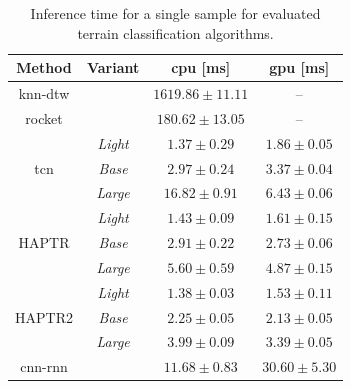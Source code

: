 \documentclass[a4paper, 10pt, twoside]{report}
\begin{document}
\begin{table}[ht]
\centering

\caption{ Inference time for a single sample for evaluated terrain classification algorithms.}

\begin{tabular}{cccc}
\hline
Method                 & Variant &  \acrshort{cpu} [ms] &  \acrshort{gpu} [ms] \\ 
 \hline
\acrshort{knn}-\acrshort{dtw}              &            & $1619.86 \pm 11.11 $               & -- \\ 
\acrshort{rocket}              &            &  $180.62 \pm 13.05 $                   &  -- \\\hline 
            

\multirow{3}{*}{\acrshort{tcn}}   & \textit{Light}       &  $1.37\pm0.29$ &  $1.86\pm0.05$ \\
                       & \textit{Base}      &  $2.97\pm0.24$ & $3.37\pm0.04$ \\
                       & \textit{Large}    &  $16.82\pm0.91$ & $6.43\pm0.06$ \\ \hline
\multirow{3}{*}{HAPTR} & \textit{Light}       &  $1.43\pm0.09$     &    $1.61\pm0.15$ \\
                       & \textit{Base}      &  $2.91\pm0.22$    &    $2.73\pm0.06$ \\
                       & \textit{Large}     &  $5.60\pm0.59$ & $4.87\pm0.15$\\ \hline
\multirow{3}{*}{HAPTR2} & \textit{Light} & $1.38\pm0.03$ & $1.53\pm0.11$ \\
                         & \textit{Base}  & $2.25\pm0.05$ & $2.13\pm0.05$ \\
                         & \textit{Large} & $3.99\pm0.09$ & $3.39\pm0.05$ \\ \hline
\multirow{1}{*}{\acrshort{cnn}-\acrshort{rnn}}~\cite{KubaRNN} &        &   $11.68\pm0.83$     &       $30.60\pm5.30$          \\ \hline
\end{tabular}

\label{tab:dl_inference}
\end{table}
\end{document}
